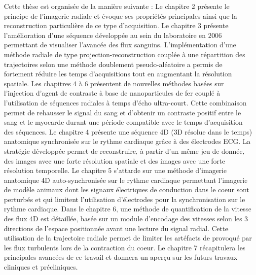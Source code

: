 Cette thèse est organisée de la manière suivante : Le chapitre 2 présente le principe de l'imagerie radiale et évoque ses propriétés principales ainsi que la reconstruction particulière de ce type d'acquisition. Le chapitre 3 présente l'amélioration d'une séquence développée au sein du laboratoire en 2006 permettant de visualiser l'avancée des flux sanguins. L'implémentation d'une méthode radiale de type projection-reconstruction couplée à une répartition des trajectoires selon une méthode doublement pseudo-aléatoire a permis de fortement réduire les temps d'acquisitions tout en augmentant la résolution spatiale. 
Les chapitres 4 à 6 présentent de nouvelles méthodes basées sur l'injection d'agent de contraste à base de nanoparticules de fer couplé à l'utilisation de séquences radiales à temps d'écho ultra-court. Cette combinaison permet de rehausser le signal du sang et d'obtenir un contraste positif entre le sang et le myocarde durant une période compatible avec le temps d'acquisition des séquences. Le chapitre 4 présente une séquence 4D (3D résolue dans le temps) anatomique synchronisée sur le rythme cardiaque grâce à des électrodes ECG. La stratégie développée permet de reconstruire, à partir d'un même jeu de donnée, des images avec une forte résolution spatiale et des images avec une forte résolution temporelle. Le chapitre 5 s'attarde sur une méthode d'imagerie anatomique 4D auto-synchronisée sur le rythme cardiaque permettant l'imagerie de modèle animaux dont les signaux électriques de conduction dans le coeur sont perturbés et qui limitent l'utilisation d'électrodes pour la synchronisation sur le rythme cardiaque. Dans le chapitre 6, une méthode de quantification de la vitesse des flux 4D est détaillée, basée sur un module d'encodage des vitesses selon les 3 directions de l'espace positionnée avant une lecture du signal radial. Cette utilisation de la trajectoire radiale permet de limiter les artéfacts de provoqué par les flux turbulents lors de la contraction du coeur.
Le chapitre 7 récapitulera les principales avancées de ce travail et donnera un aperçu sur les futurs travaux cliniques et précliniques.





